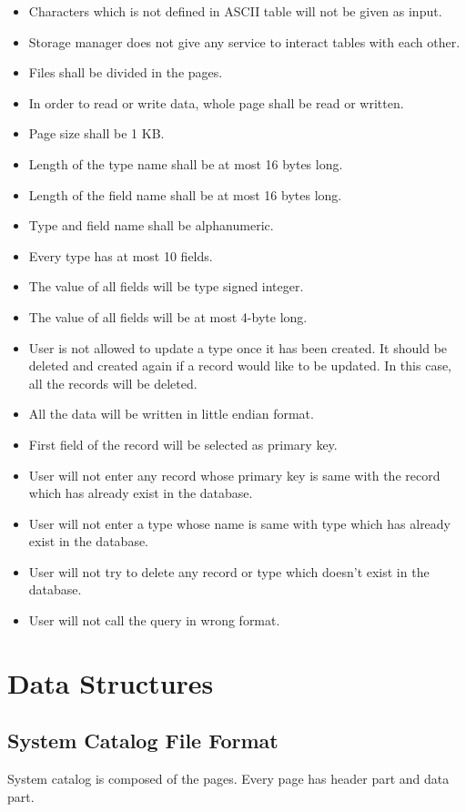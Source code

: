 \documentclass[12pt]{article}
\begin{document}
\begin{itemize}
\item Characters which is not defined in ASCII table will not be given as input.
\item Storage manager does not give any service to interact tables with each other.
\item Files shall be divided in the pages.
\item In order to read or write data, whole page shall be read or written.
\item Page size shall be 1 KB.
\item Length of the type name shall be at most 16 bytes long.
\item Length of the field name shall be at most 16 bytes long.
\item Type and field name shall be alphanumeric.
\item Every type has at most 10 fields.
\item The value of all fields will be type signed integer.
\item The value of all fields will be at most 4-byte long.
\item User is not allowed to update a type once it has been created. It should be deleted and created again if a record would like to be updated. In this case, all the records will be deleted.
\item All the data will be written in little endian format.
\item First field of the record will be selected as primary key.
\item User will not enter any record whose primary key is same with the record which has already exist in the database.
\item User will not enter a type whose name is same with type which has already exist in the database.
\item User will not try to delete any record or type which doesn't exist in the database.
\item User will not call the query in wrong format.

\end{itemize}


\section{Data Structures}
\subsection{System Catalog File Format}
System catalog is composed of the pages. Every page has header part and data part. 
\end{document}
